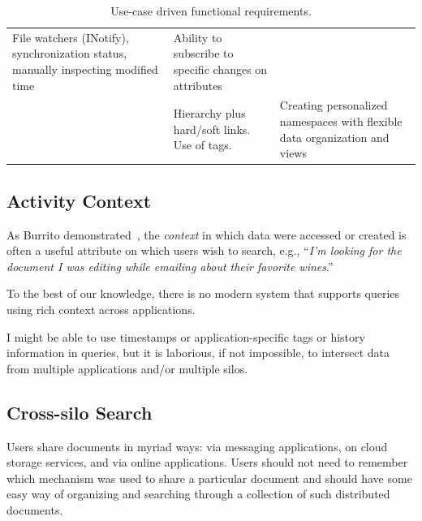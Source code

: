 \begin{table}[!th]
\begin{adjustbox}{max width=\textwidth}
{\begin{tabular}{p{}p{}p{}}
                File watchers (INotify), synchronization status, manually inspecting modified time                                                                      &
                Ability to subscribe to specific changes on attributes
                \\
                \usecasepersnamespace                                                                                                                                   &
                Hierarchy plus hard/soft links. Use of tags.                                                                                                            &
                Creating per\-son\-al\-ized name\-spaces with flexible data organization and views
                \\
                \hline
            \end{tabular}
        }
    \end{adjustbox}
    \caption{Use-case driven functional requirements.}
    \label{table:usecases}
\end{table}

\subsection{Activity Context}

As Burrito demonstrated~\cite{guo2012burrito}, the \emph{context} in which data
were accessed or created is often a useful attribute on which users wish to
search, e.g., ``\emph{I'm looking for the document I was editing while emailing
    \persa about their favorite wines}.''

To the best of our knowledge, there is no modern system that supports queries
using rich context across applications.

I might be able to use timestamps or application-specific tags or history
information in queries, but it is laborious, if not impossible, to intersect
data from multiple applications and/or multiple silos.

\subsection{Cross-silo Search}
Users share documents in myriad ways: via messaging applications, on cloud
storage services, and via online applications. Users should not need to remember
which mechanism was used to share a particular document and should have some
easy way of organizing and searching through a collection of such distributed
documents.

